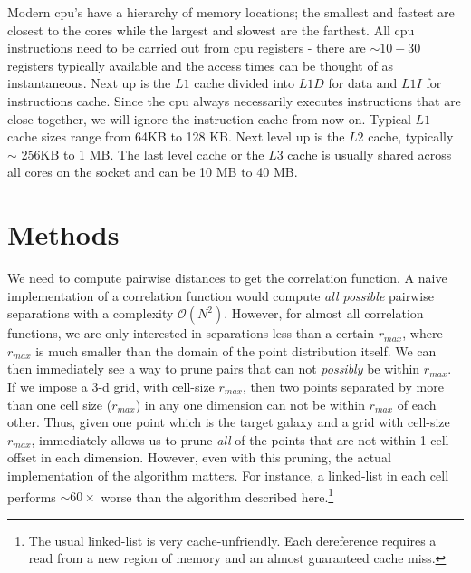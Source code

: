 \documentclass[preprint,authoryear,12pt]{elsarticle}
\newcommand{\rmax}{\ensuremath{{r_{max}}}\xspace}
\begin{document}
Modern cpu's have a hierarchy of memory locations; the smallest and fastest are closest to the cores while the largest and slowest are the
farthest. All cpu instructions need to be carried out from cpu registers - there are $\sim 10-30$ registers typically available and the 
access times can be thought of as instantaneous. Next up is the $L1$ cache divided into $L1D$ for data and $L1I$ for instructions cache. Since 
the cpu always necessarily executes instructions that are close together, we will ignore the instruction cache from now on. Typical $L1$ cache 
sizes range from 64KB to 128 KB. Next level up is the $L2$ cache, typically $\sim$ 256KB to 1 MB. The last level cache or the $L3$ cache 
is usually shared across all cores on the socket and can be 10 MB to 40 MB. 


\section{Methods}
We need to compute pairwise distances to get the correlation function. A naive implementation of a correlation function would compute {\em all possible} 
pairwise separations with a complexity $\mathcal{O}(N^2)$. However, for almost all correlation functions, we are only interested in separations less than 
a certain \rmax, where \rmax is much smaller than the domain of the point distribution itself. We can then immediately see a way to prune pairs that can not
{\em possibly} be within \rmax. If we impose a 3-d grid, with cell-size \rmax, then two points separated by more than one cell size (\rmax) in any one 
dimension can not be within \rmax of each other. Thus, given one point which is the target galaxy and a grid with cell-size \rmax, 
immediately allows us to prune {\em all} of the points that are not within 1 cell offset in each dimension. However, even with this pruning, the actual 
implementation of the algorithm matters. For instance, a linked-list in each cell performs $\sim 60\times$ worse than the algorithm described here.\footnote{The 
usual linked-list is very cache-unfriendly. Each dereference requires a read from a new region of memory and an almost guaranteed cache miss. } 
\end{document}
